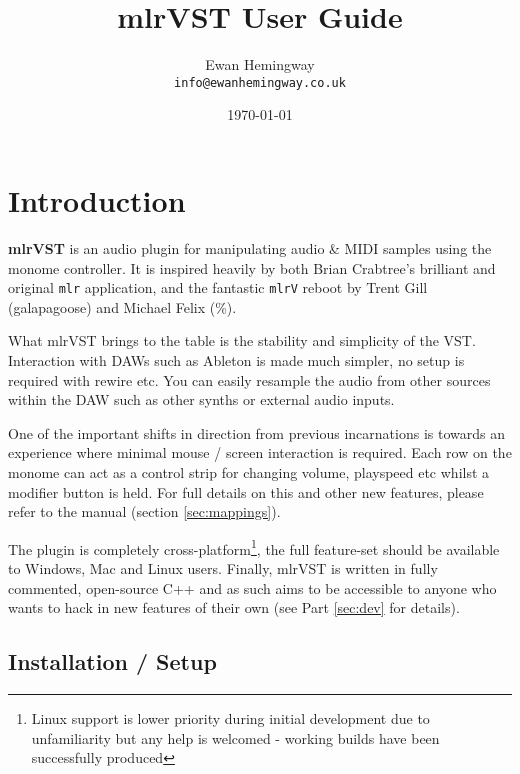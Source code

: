 \documentclass[10pt,a4paper]{report}
\begin{document}
\title{mlrVST User Guide}
\author{Ewan Hemingway\\
  \texttt{info@ewanhemingway.co.uk}}
\date{\today}

\maketitle



\setcounter{secnumdepth}{2}

\tableofcontents

\setcounter{chapter}{0}
\chapter{Introduction}

\textbf{mlrVST} is an audio plugin for manipulating audio \& MIDI samples using the monome controller. It is inspired heavily by both Brian Crabtree's brilliant and original \texttt{mlr} application, and the fantastic \texttt{mlrV} reboot by Trent Gill (galapagoose) and Michael Felix (\%). 

What mlrVST brings to the table is the stability and simplicity of the VST. Interaction with DAWs such as Ableton is made much simpler, no setup is required with rewire etc. You can easily resample the audio from other sources within the DAW such as other synths or external audio inputs.

 One of the important shifts in direction from previous incarnations is towards an experience where minimal mouse / screen interaction is required. Each row on the monome can act as a control strip for changing volume, playspeed etc whilst a modifier button is held. For full details on this and other new features, please refer to the manual (section \ref{sec:mappings}).

  The plugin is completely cross-platform\footnote{Linux support is lower priority during initial development due to unfamiliarity but any help is welcomed - working builds have been successfully produced}, the full feature-set should be available to Windows, Mac and Linux users. Finally, mlrVST is written in fully commented, open-source C++ and as such aims to be accessible to anyone who wants to hack in new features of their own (see Part \ref{sec:dev} for details).

\section{Installation / Setup}
\end{document}

